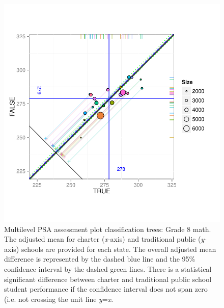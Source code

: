 \begin{figure}[h!]
\begin{center}
\includegraphics[width=\textwidth,trim=0 .6in 0 .6in]{../Figures2009/g8math-mlpsa-ctree-circ.pdf}
\caption[Multilevel PSA assessment plot classification trees: Grade 8 math]{Multilevel PSA assessment plot classification trees: Grade 8 math. The adjusted mean for charter (\textit{x}-axis) and traditional public (\textit{y}-axis) schools are provided for each state. The overall adjusted mean difference is represented by the dashed blue line and the 95\% confidence interval by the dashed green lines. There is a statistical significant difference between charter and traditional public school student performance if the confidence interval does not span zero (i.e. not crossing the unit line \textit{y}=\textit{x}.}
\end{center}
\end{figure}

